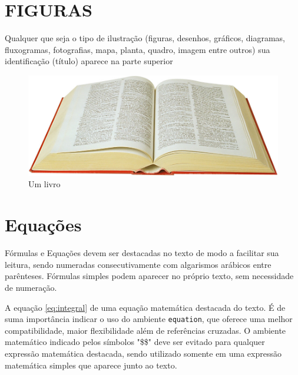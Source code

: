 \documentclass[
  12pt,		%
  a4paper,	%
  openright,%
  oneside,	%
  chapter=TITLE,		%
  section=TITLE,		%
  english,	%
  french,	%
  spanish,	%
  brazil
]{abntex2}
\begin{document}
         
         
         \section{FIGURAS}

            
                Qualquer que seja o tipo de ilustração (figuras, desenhos, gráficos, diagramas, fluxogramas, fotografias, mapa, planta, quadro, imagem entre outros) sua identificação (título) aparece na parte superior
                
                \begin{figure}[h]
                    \centering
                    \caption{Um livro}
                    \includegraphics{book}
                    \par
                \end{figure}
                
    
        \section {Equações}
        
        Fórmulas e Equações devem ser destacadas no texto de modo a facilitar sua leitura, sendo numeradas consecutivamente com algarismos arábicos entre parênteses. Fórmulas simples podem aparecer no próprio texto, sem necessidade de numeração.
        
        A equação \ref{eq:integral} de uma equação matemática destacada do texto. É de suma importância indicar o uso do ambiente \verb|equation|, que oferece uma melhor compatibilidade, maior flexibilidade além de referências cruzadas. O ambiente matemático indicado pelos símbolos "\$\$" deve ser evitado para qualquer expressão matemática destacada, sendo utilizado somente em uma expressão matemática simples que aparece junto ao texto.
        
\end{document}
